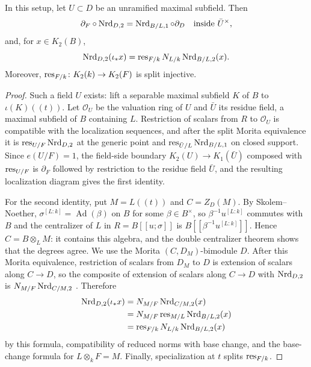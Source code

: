 \begin{lemma}\label{lem:second-residue-zero-norms}
In this setup, let $U\subset D$ be an unramified maximal subfield.
Then
\[
 \partial_F\circ\operatorname{Nrd}_{D,2}=\operatorname{Nrd}_{B/L,1}\circ\partial_D\quad\text{inside }\bar U^\times,
\]
and, for $x\in K_2(B)$,
\[
 \operatorname{Nrd}_{D,2}(\iota_*x)=\operatorname{res}_{F/k}N_{L/k}\operatorname{Nrd}_{B/L,2}(x).
\]
Moreover, $\operatorname{res}_{F/k}\colon K_2(k)\to K_2(F)$ is split injective.
\end{lemma}
\begin{proof}
Such a field $U$ exists: lift a separable maximal subfield $K$ of $B$ to $\iota(K)((t))$.
Let $\mathcal O_U$ be the valuation ring of $U$ and $\bar U$ its residue field, a maximal subfield of $B$ containing $L$.
Restriction of scalars from $R$ to $\mathcal O_U$ is compatible with the localization sequences, and after the split Morita equivalence it is $\operatorname{res}_{U/F}\operatorname{Nrd}_{D,2}$ at the generic point and $\operatorname{res}_{\bar U/L}\operatorname{Nrd}_{B/L,1}$ on closed support.
Since $e(U/F)=1$, the field-side boundary $K_2(U)\to K_1(\bar U)$ composed with $\operatorname{res}_{U/F}$ is $\partial_F$ followed by restriction to the residue field $\bar U$, and the resulting localization diagram gives the first identity.

For the second identity, put $M=L((t))$ and $C=Z_D(M)$.
By Skolem--Noether, $\sigma^{[L:k]}=\operatorname{Ad}(\beta)$ on $B$ for some $\beta\in B^\times$, so $\beta^{-1}u^{[L:k]}$ commutes with $B$ and the centralizer of $L$ in $R=B[[u;\sigma]]$ is $B[[\beta^{-1}u^{[L:k]}]]$.
Hence $C=B\otimes_LM$: it contains this algebra, and the double centralizer theorem shows that the degrees agree.
We use the Morita $(C,D_M)$-bimodule $D$.
After this Morita equivalence, restriction of scalars from $D_M$ to $D$ is extension of scalars along $C\to D$, so the composite of extension of scalars along $C\to D$ with $\operatorname{Nrd}_{D,2}$ is $N_{M/F}\operatorname{Nrd}_{C/M,2}$ \cite[Proposition 6.6.1(1)]{KahnLevine2010}.
Therefore
\[
 \begin{aligned}
 \operatorname{Nrd}_{D,2}(\iota_*x)
 &=N_{M/F}\operatorname{Nrd}_{C/M,2}(x)\\
 &=N_{M/F}\operatorname{res}_{M/L}\operatorname{Nrd}_{B/L,2}(x)\\
 &=\operatorname{res}_{F/k}N_{L/k}\operatorname{Nrd}_{B/L,2}(x)
 \end{aligned}
\]
by this formula, compatibility of reduced norms with base change, and the base-change formula for $L\otimes_kF=M$.
Finally, specialization at $t$ splits $\operatorname{res}_{F/k}$.
\end{proof}

